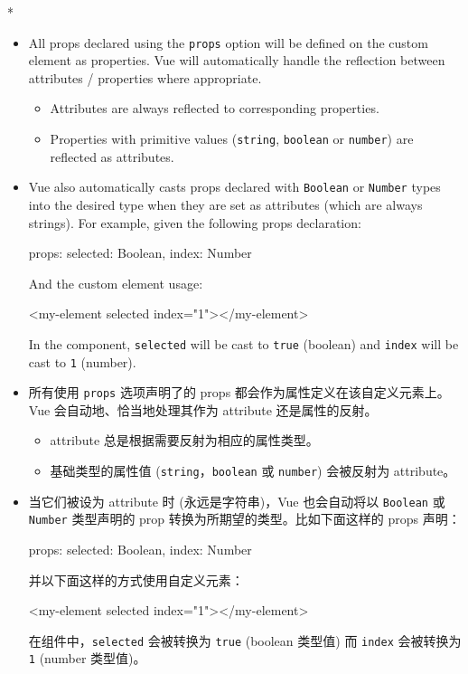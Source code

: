 \begin{paracol}{2} 
\switchcolumn[0]*%
\begin{itemize}
\item
  All props declared using the \texttt{props} option will be defined on
  the custom element as properties. Vue will automatically handle the
  reflection between attributes / properties where appropriate.
  \begin{itemize}
  \item
    Attributes are always reflected to corresponding properties.
  \item
    Properties with primitive values (\texttt{string}, \texttt{boolean}
    or \texttt{number}) are reflected as attributes.
  \end{itemize}
\item
  Vue also automatically casts props declared with \texttt{Boolean} or
  \texttt{Number} types into the desired type when they are set as
  attributes (which are always strings). For example, given the
  following props declaration:
~\begin{codeHtml}
props: {
  selected: Boolean,
  index: Number
}
\end{codeHtml}
  And the custom element usage:
~\begin{codeHtml}
<my-element selected index="1"></my-element>
\end{codeHtml}
  In the component, \texttt{selected} will be cast to \texttt{true}
  (boolean) and \texttt{index} will be cast to \texttt{1} (number).
\end{itemize}
\switchcolumn
\begin{itemize}
\item
  所有使用 \texttt{props} 选项声明了的 props
  都会作为属性定义在该自定义元素上。Vue 会自动地、恰当地处理其作为
  attribute 还是属性的反射。
  \begin{itemize}
  \item
    attribute 总是根据需要反射为相应的属性类型。
  \item
    基础类型的属性值 (\texttt{string}，\texttt{boolean} 或
    \texttt{number}) 会被反射为 attribute。
  \end{itemize}
\item
  当它们被设为 attribute 时 (永远是字符串)，Vue 也会自动将以
  \texttt{Boolean} 或 \texttt{Number} 类型声明的 prop
  转换为所期望的类型。比如下面这样的 props 声明：
\begin{codeHtml}
props: {
  selected: Boolean,
  index: Number
}
\end{codeHtml}
  并以下面这样的方式使用自定义元素：
\begin{codeHtml}
<my-element selected index="1"></my-element>
\end{codeHtml}
  在组件中，\texttt{selected} 会被转换为 \texttt{true} (boolean 类型值)
  而 \texttt{index} 会被转换为 \texttt{1} (number 类型值)。
\end{itemize}
\end{paracol}


